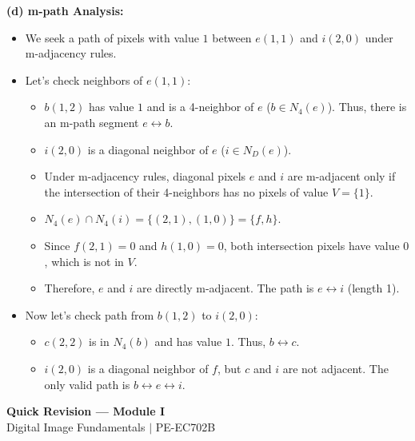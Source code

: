\documentclass[12pt,a4paper]{article}
\begin{document}
\begin{tcolorbox}[examplebox, title={Distance Calculations and Path Analysis}]
\textbf{(d) m-path Analysis:}
\begin{itemize}[leftmargin=*, itemsep=2pt]
  \item We seek a path of pixels with value $1$ between $e(1,1)$ and $i(2,0)$ under m-adjacency rules.
  \item Let's check neighbors of $e(1,1)$:
    \begin{itemize}[leftmargin=1em, itemsep=1.5pt]
      \item $b(1,2)$ has value $1$ and is a 4-neighbor of $e$ ($b \in N_4(e)$). Thus, there is an m-path segment $e \leftrightarrow b$.
      \item $i(2,0)$ is a diagonal neighbor of $e$ ($i \in N_D(e)$).
      \item Under m-adjacency rules, diagonal pixels $e$ and $i$ are m-adjacent only if the intersection of their 4-neighbors has no pixels of value $V=\{1\}$.
      \item $N_4(e) \cap N_4(i) = \{ (2,1), (1,0) \} = \{ f, h \}$.
      \item Since $f(2,1) = 0$ and $h(1,0) = 0$, both intersection pixels have value $0$, which is not in $V$.
      \item Therefore, $e$ and $i$ are directly m-adjacent. The path is $e \leftrightarrow i$ (length 1).
    \end{itemize}
  \item Now let's check path from $b(1,2)$ to $i(2,0)$:
    \begin{itemize}[leftmargin=1em, itemsep=1.5pt]
      \item $c(2,2)$ is in $N_4(b)$ and has value $1$. Thus, $b \leftrightarrow c$.
      \item $i(2,0)$ is a diagonal neighbor of $f$, but $c$ and $i$ are not adjacent. The only valid path is $b \leftrightarrow e \leftrightarrow i$.
    \end{itemize}
\end{itemize}
\end{tcolorbox}

\newpage

\begin{center}
  {\large\bfseries\color{myred} Quick Revision --- Module I}\\[3pt]
  {\small\color{mydark} Digital Image Fundamentals $|$ PE-EC702B}
\end{center}
\noindent{\color{myred}\rule{\linewidth}{1.2pt}}
\vspace{4pt}
\end{document}
